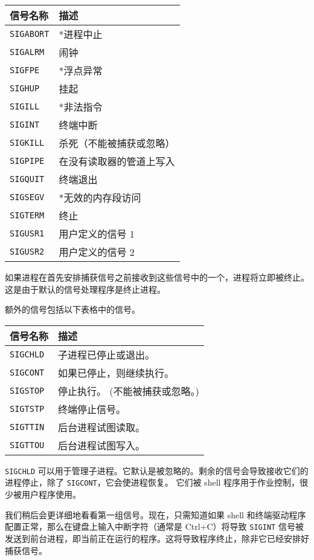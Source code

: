 \documentclass{ctexart}
\begin{document}
\begin{tabular}{|l|l|}  
    \hline  
    信号名称 & 描述 \\  
    \hline  
    \texttt{SIGABORT} & *进程中止 \\  
    \texttt{SIGALRM} & 闹钟 \\  
    \texttt{SIGFPE} & *浮点异常 \\  
    \texttt{SIGHUP} & 挂起 \\  
    \texttt{SIGILL} & *非法指令 \\  
    \texttt{SIGINT} & 终端中断 \\  
    \texttt{SIGKILL} & 杀死（不能被捕获或忽略） \\  
    \texttt{SIGPIPE} & 在没有读取器的管道上写入 \\  
    \texttt{SIGQUIT} & 终端退出 \\  
    \texttt{SIGSEGV} & *无效的内存段访问 \\  
    \texttt{SIGTERM} & 终止 \\  
    \texttt{SIGUSR1} & 用户定义的信号 1 \\  
    \texttt{SIGUSR2} & 用户定义的信号 2 \\  
    \hline  
\end{tabular}  
    
如果进程在首先安排捕获信号之前接收到这些信号中的一个，进程将立即被终止。这是由于默认的信号处理程序是终止进程。
  
额外的信号包括以下表格中的信号。  

\begin{tabular}{|l|l|}  
    \hline  
    信号名称 & 描述 \\  
    \hline  
    \texttt{SIGCHLD} & 子进程已停止或退出。 \\  
    \texttt{SIGCONT} & 如果已停止，则继续执行。 \\  
    \texttt{SIGSTOP} & 停止执行。 (不能被捕获或忽略。) \\  
    \texttt{SIGTSTP} & 终端停止信号。 \\  
    \texttt{SIGTTIN} & 后台进程试图读取。 \\  
    \texttt{SIGTTOU} & 后台进程试图写入。 \\  
    \hline  
\end{tabular}  

\texttt{SIGCHLD} 可以用于管理子进程。它默认是被忽略的。剩余的信号会导致接收它们的进程停止，除了 \texttt{SIGCONT}，它会使进程恢复。
它们被 shell 程序用于作业控制，很少被用户程序使用。  
  
我们稍后会更详细地看看第一组信号。现在，只需知道如果 shell 和终端驱动程序配置正常，那么在键盘上输入中断字符（通常是 Ctrl+C）将导致 \texttt{SIGINT} 
信号被发送到前台进程，即当前正在运行的程序。这将导致程序终止，除非它已经安排好捕获信号。  
  
\end{document}

